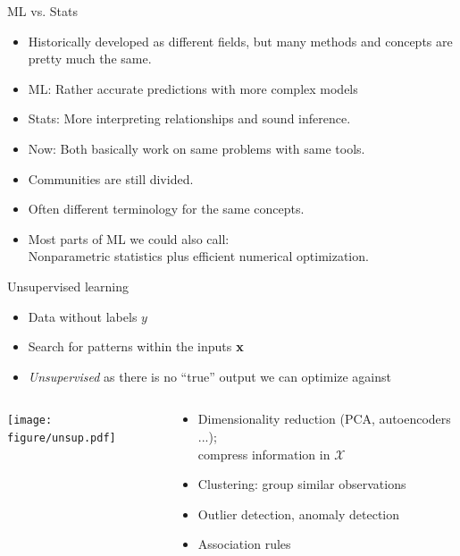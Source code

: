 \documentclass[11pt,compress,t,notes=noshow, xcolor=table]{beamer}
\begin{document}

\begin{frame}{ML vs. Stats}


\begin{itemize}
	\item Historically developed as different fields, but many
      methods and concepts are pretty much the same.
	\item ML: Rather accurate predictions with more complex models
    \item Stats: More interpreting relationships and sound inference.
	\item Now: Both basically work on same problems with same tools.
    \item Communities are still divided.
    \item Often different terminology for the same concepts.
    \item Most parts of ML we could also call:\\Nonparametric statistics plus efficient numerical optimization.
\end{itemize}

\end{frame}


\begin{vbframe}{Unsupervised learning}
\begin{itemize}
  \item Data without labels $y$
  \item Search for patterns within the inputs $\mathbf{x}$
  \item \textit{Unsupervised} as there is no ``true'' output
      we can optimize against
\end{itemize}

\lz

\begin{columns}
\begin{column}{0.45\textwidth}
\begin{center}
    \texttt{[image: figure/unsup.pdf]}
\end{center}
\end{column}
\begin{column}{0.55\textwidth}
\begin{itemize}
    \item Dimensionality reduction (PCA, autoencoders ...);\\ 
        compress information in $\mathcal X$
    \item Clustering: group similar observations
    \item Outlier detection, anomaly detection
    \item Association rules
\end{itemize}
\end{column}
\end{columns}
\end{vbframe}
\end{document}
